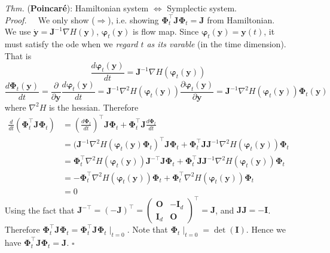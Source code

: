 \documentclass[a4paper, 11pt]{article}
\begin{document}
\begin{itemize}
	\item[\textit{Thm.}] (\textbf{Poincar\'e}): Hamiltonian system $\iff$ Symplectic system. \\
	\textit{Proof.~~} We only show ($\Rightarrow$), i.e. showing $\bm{\Phi}_t^{\top} \bm{J} \bm{\Phi}_t = \bm{J}$ from Hamiltonian. \\
	We use $\dot{\bm{y}} = \bm{J}^{-1} \nabla H(\bm{y})$, $\bm{\varphi}_t(\bm{y})$ is flow map. Since $\bm{\varphi}_t(\bm{y}) = \bm{y}(t)$, it must satisfy the ode when we \emph{regard $t$ as its varable} (in the time dimension). That is
	$$
	\frac{d \bm{\varphi}_t(\bm{y})}{dt} = \bm{J}^{-1} \nabla H(\bm{\varphi}_t(\bm{y}))
	$$
	$$
	\frac{d \bm{\Phi}_t(\bm{y})}{dt} = \frac{\partial}{\partial \bm{y}}\frac{d \bm{\varphi}_t(\bm{y})}{dt} =  \bm{J}^{-1} \nabla^2 H(\bm{\varphi}_t(\bm{y})) \frac{\partial \bm{\varphi}_t(\bm{y})}{\partial \bm{y}} = \bm{J}^{-1} \nabla^2 H(\bm{\varphi}_t(\bm{y})) \bm{\Phi}_t(\bm{y})
	$$
	where $\nabla^2H$ is the hessian. Therefore
	\begin{equation}
		\begin{split}
			\frac{d}{dt}\left(\bm{\Phi}_t^{\top}\bm{J} \bm{\Phi}_t\right) &= \left(\frac{d \bm{\Phi}_t}{dt}\right)^{\top} \bm{J} \bm{\Phi}_t + \bm{\Phi}_t^{\top}\bm{J} \frac{d \bm{\Phi}_t}{dt} \\
			&= (\bm{J}^{-1} \nabla^2 H(\bm{\varphi}_t(\bm{y}) \bm{\Phi}_t)^{\top}\bm{J}\bm{\Phi}_t + \bm{\Phi}_t^{\top}\bm{J}\bm{J}^{-1} \nabla^2 H(\bm{\varphi}_t(\bm{y})) \bm{\Phi}_t \\
			&= \bm{\Phi}_t^{\top}\nabla^2 H(\bm{\varphi}_t(\bm{y}))\bm{J}^{-\top} \bm{J}\bm{\Phi}_t + \bm{\Phi}_t^{\top}\bm{J}\bm{J}^{-1} \nabla^2 H(\bm{\varphi}_t(\bm{y})) \bm{\Phi}_t \\
			& = -\bm{\Phi}_t^{\top}\nabla^2 H(\bm{\varphi}_t(\bm{y})) \bm{\Phi}_t + \bm{\Phi}_t^{\top}\nabla^2 H(\bm{\varphi}_t(\bm{y})) \bm{\Phi}_t \\
			&= 0
		\end{split}
	\end{equation}
	Using the fact that $\bm{J}^{-\top}=(-\bm{J})^{\top} = \begin{pmatrix}
		\bm{O} & -\bm{I}_d \\
		\bm{I}_d & \bm{O}
	\end{pmatrix}^{\top} = \bm{J}$, and $\bm{JJ}=- \bm{I}$.
	Therefore $\bm{\Phi}_t^{\top} \bm{J}\bm{\Phi}_t = \bm{\Phi}_t^{\top} \bm{J}\bm{\Phi}_t\mid_{t=0}$. Note that $\bm{\Phi}_t\mid_{t=0} = \det(\bm{I})$. Hence we have $\bm{\Phi}_t^{\top} \bm{J}\bm{\Phi}_t = \bm{J}$. $\square$
\end{itemize}
\end{document}
